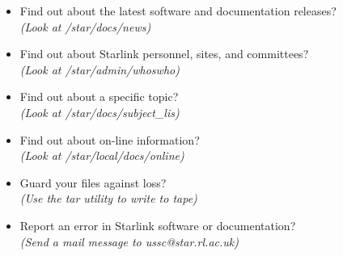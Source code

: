 \begin{itemize}
\item Find out about the latest software and documentation releases?\\
\hspace*{10mm} {\em (Look at /star/\-docs/\-news)}
\item Find out about Starlink personnel, sites, and committees?\\
\hspace*{10mm} {\em (Look at /star/\-admin/\-whoswho)}
\item Find out about a specific topic?\\
\hspace*{10mm} {\em (Look at /star/\-docs/\-subject\_lis)}
\item Find out about on-line information?\\
\hspace*{10mm} {\em (Look at /star/\-local/\-docs/\-online)}
\item Guard your files against loss?\\
\hspace*{10mm} {\em (Use the tar utility to write to tape)}
\item Report an error in Starlink software or documentation?\\
\hspace*{10mm} {\em (Send a mail message to ussc@star.rl.ac.uk)}
\end{itemize}

